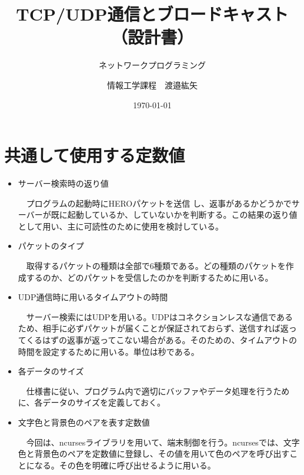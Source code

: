 \documentclass[uplatex,dvipdfmx,11pt,a4paper]{jsarticle} %
\title{TCP/UDP通信とブロードキャスト（設計書）}
\subtitle{ネットワークプログラミング}
\author{情報工学課程　渡邉紘矢}
\institute{学籍番号:18122508}
\date{\today}
\begin{document}
\maketitle
% 
\setcounter{page}{1}

\section{共通して使用する定数値}
\begin{itemize}
    \item サーバー検索時の返り値
    
    　プログラムの起動時にHEROパケットを送信 し、返事があるかどうかでサーバーが既に起動しているか、していないかを判断する。この結果の返り値として用い、主に可読性のために使用を検討している。
    

    \item パケットのタイプ

        　取得するパケットの種類は全部で6種類である。どの種類のパケットを作成するのか、どのパケットを受信したのかを判断するために用いる。
    

    \item UDP通信時に用いるタイムアウトの時間

        　サーバー検索にはUDPを用いる。UDPはコネクションレスな通信であるため、相手に必ずパケットが届くことが保証されておらず、送信すれば返ってくるはずの返事が返ってこない場合がある。そのための、タイムアウトの時間を設定するために用いる。単位は秒である。
    

    \item 各データのサイズ

        　仕様書に従い、プログラム内で適切にバッファやデータ処理を行うために、各データのサイズを定義しておく。
    

    \item 文字色と背景色のペアを表す定数値

        　今回は、ncursesライブラリを用いて、端末制御を行う。ncursesでは、文字色と背景色のペアを定数値に登録し、その値を用いて色のペアを呼び出すことになる。その色を明確に呼び出せるように用いる。
    
\end{itemize}
\end{document}
